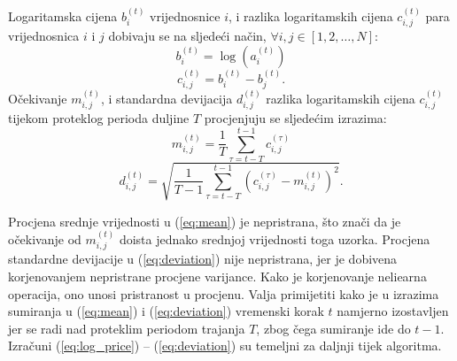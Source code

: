 \documentclass[lmodern, utf8, diplomski, numeric]{fer}
\newcommand{\q}{\left}
\newcommand{\w}{\right}
\begin{document}
  Logaritamska cijena $b_i^{\q(t\w)}$ vrijednosnice $i$, i razlika logaritamskih cijena $c_{i,j}^{\q(t\w)}$ para vrijednosnica $i$ i $j$ dobivaju se na sljedeći način, $\forall i, j \in \q[1, 2, \ldots, N\w]$:
  \begin{equation}
    \label{eq:log_price}
  b_i^{\q(t\w)} = \log\q(a_i^{\q(t\w)}\w)
  \end{equation}
  \begin{equation}
    \label{eq:log_price_diff}
    c_{i,j}^{\q(t\w)} = b_i^{\q(t\w)} - b_j^{\q(t\w)}.
  \end{equation}
  Očekivanje $m_{i,j}^{\q(t\w)}$, i standardna devijacija $d_{i,j}^{\q(t\w)}$ razlika logaritamskih cijena $c_{i,j}^{\q(t\w)}$ tijekom proteklog perioda duljine $T$ procjenjuju se sljedećim izrazima:
  \begin{equation}
  \label{eq:mean}
    m_{i,j}^{\q(t\w)} = \frac{1}{T}\sum_{\tau = t - T}^{t - 1} c_{i,j}^{(\tau)}
  \end{equation}
  \begin{equation}
  \label{eq:deviation}
    d_{i,j}^{\q(t\w)} = \sqrt{\frac{1}{T - 1}\sum_{\tau=t - T}^{t - 1} \q(c_{i,j}^{(\tau)} - m_{i,j}^{\q(t\w)} \w)^2}.
  \end{equation}
  
  Procjena srednje vrijednosti u (\ref{eq:mean}) je nepristrana, što znači da je očekivanje od $m_{i,j}^{\q(t\w)}$ doista jednako srednjoj vrijednosti toga uzorka.
  Procjena standardne devijacije u (\ref{eq:deviation}) nije nepristrana, jer je dobivena korjenovanjem nepristrane procjene varijance.
  Kako je korjenovanje neliearna operacija, ono unosi pristranost u procjenu.
  Valja primijetiti kako je u izrazima sumiranja u (\ref{eq:mean}) i (\ref{eq:deviation}) vremenski korak $t$ namjerno izostavljen jer se radi nad proteklim periodom trajanja $T$, zbog čega sumiranje ide do $t - 1$.
  Izračuni (\ref{eq:log_price}) -- (\ref{eq:deviation}) su temeljni za daljnji tijek algoritma.
\end{document}
